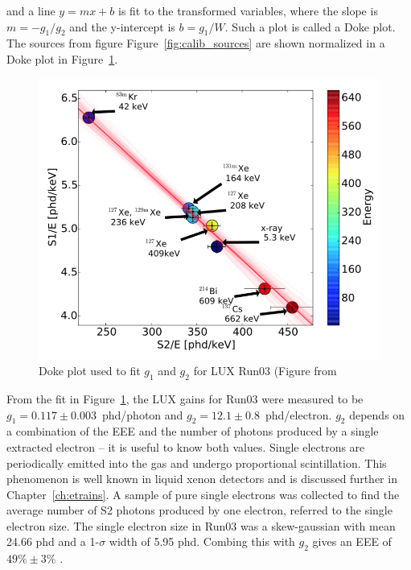 and a line $y = mx + b$ is fit to the transformed variables, where the slope is $m = -g_{1} / g_{2}$ and the y-intercept is $b = g_{1} / W$. Such a plot is called a Doke plot. The sources from figure Figure~\ref{fig:calib_sources} are shown normalized in a Doke plot in Figure~\ref{fig:doke}.

\begin{figure}[htbp]
\begin{center}
\includegraphics[width=\textwidth]{figures/lux/doke.png}
\caption{ Doke plot used to fit $g_{1}$ and $g_{2}$ for LUX Run03 (Figure from \cite{LUX:Run03Comprehensive}}
\label{fig:doke}
\end{center}
\end{figure}

From the fit in Figure~\ref{fig:doke}, the \ac{LUX} gains for Run03 were measured to be $g_{1} = 0.117 \pm 0.003$~phd/photon and $g_{2} = 12.1 \pm 0.8$~phd/electron. $g_{2}$ depends on a combination of the \ac{EEE} and the number of photons produced by a single extracted electron -- it is useful to know both values. Single electrons are periodically emitted into the gas and undergo proportional scintillation. This phenomenon is well known in liquid xenon detectors and is discussed further in Chapter~\ref{ch:etrains}. A sample of pure single electrons was collected to find the average number of S2 photons produced by one electron, referred to the single electron size. The single electron size in Run03 was a skew-gaussian with mean 24.66 phd and a 1-$\sigma$ width of 5.95 phd. Combing this with $g_{2}$ gives an \ac{EEE} of $49\% \pm 3\%$ \cite{LUX:Run03Comprehensive}.

